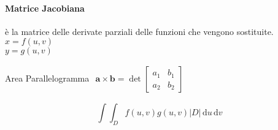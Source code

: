 \documentclass[16pt]{article}
\newcommand{\ud}{\,\mathrm{d}}
\begin{document}
\paragraph{Matrice Jacobiana} è la matrice delle derivate parziali delle funzioni che vengono sostituite.\\
$x = f(u,v)$\\
$y = g(u,v)$

Area Parallelogramma
\begin{math}
\displaystyle {
\begin{aligned}\mathbf {a} \times \mathbf {b} = \det{
	\begin{bmatrix}
		a_{1} & b_{1}\\
		a_{2} & b_{2}
	\end{bmatrix}
	}
\end{aligned}
}
\end{math}

\begin{equation}
	\int\int_{D} f(u,v) g(u,v)|D|\ud u \ud v
\end{equation}
\end{document}
